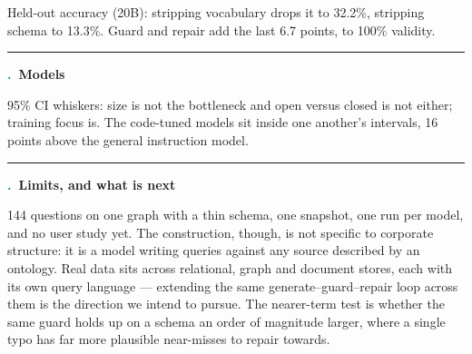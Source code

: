 \documentclass{article}
\newcommand{\HeadF}{\fontsize{38}{46}\selectfont\bfseries}
\newcommand{\SmallF}{\fontsize{22}{30}\selectfont}
\newcounter{sec}
\newcommand{\heading}[1]{%
  \vspace{1mm}%
  {\color{teal}\rule{\linewidth}{2.4pt}}\par\vspace{2mm}%
  \stepcounter{sec}%
  {\HeadF\textcolor{teal}{\thesec.}~#1\par}\vspace{-2mm}}
\newcommand{\modbar}[6]{%
  \node[anchor=south west, font=\SmallF, text=ink] at (0,#1+5.5) {#5};
  \draw[fill=#6, draw=none] (0,#1) rectangle (#2,#1+5);
  \draw[ink, line width=0.5pt] (#3,#1+2.5) -- (#4,#1+2.5);
  \draw[ink, line width=0.5pt] (#3,#1+1.2) -- (#3,#1+3.8);
  \draw[ink, line width=0.5pt] (#4,#1+1.2) -- (#4,#1+3.8);
  \node[anchor=west, font=\SmallF\bfseries, text=ink] at (#4+2,#1+2.5) {#2\%};
}
\newcommand{\baraxis}{%
  \draw[rulec] (0,-4) -- (100,-4);
  \node[anchor=north, font=\SmallF, text=muted] at (0,-4) {0};
  \node[anchor=north, font=\SmallF, text=muted] at (50,-4) {50};
  \node[anchor=north, font=\SmallF, text=muted] at (100,-4) {100\%};
}
\newlength{\colw}
\begin{document}
\begin{minipage}[t]{\colw}
\vspace{-3mm}
{\SmallF\textcolor{muted}{Held-out accuracy (20B): stripping vocabulary drops it to
32.2\%, stripping schema to 13.3\%. Guard and repair add the last 6.7 points, to
100\% validity.}}

\heading{Models}

\vspace{1mm}
\begin{center}
\end{center}

\vspace{-3mm}
{\SmallF\textcolor{muted}{95\% CI whiskers: size is not the bottleneck and open
versus closed is not either; training focus is. The code-tuned models sit inside
one another's intervals, 16 points above the general instruction model.}}

\heading{Limits, and what is next}

144 questions on one graph with a thin schema, one snapshot, one run per model, and
no user study yet. The construction, though, is not specific to corporate
structure: it is a model writing queries against any source described by an
ontology. Real data sits across relational, graph and document stores, each with
its own query language --- extending the same generate--guard--repair loop across
them is the direction we intend to pursue. The nearer-term test is whether the
same guard holds up on a schema an order of magnitude larger, where a single typo
has far more plausible near-misses to repair towards.

\end{minipage}

\vspace{4mm}
\end{document}
